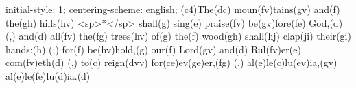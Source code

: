 initial-style: 1;
centering-scheme: english;
(c4)The(dc) moun(fv)tains(gv) and(f) the(gh) hills(hv) <sp>*</sp> shall(g) sing(e) praise(fv) be(gv)fore(fe) God,(d) (,) and(d) all(fv) the(fg) trees(hv) of(g) the(f) wood(gh) shall(hj) clap(ji) their(gi) hands:(h) (;) for(f) be(hv)hold,(g) our(f) Lord(gv) and(d) Rul(fv)er(e) com(fv)eth(d) (,) to(c) reign(dvv) for(ce)ev(ge)er,(fg) (,) al(e)le(c)lu(ev)ia,(gv) al(e)le(fe)lu(d)ia.(d)
